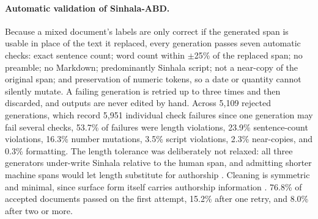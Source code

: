 \paragraph{Automatic validation of Sinhala-ABD.}
Because a mixed document's labels are only correct if the generated span is
usable in place of the text it replaced, every generation passes seven automatic
checks: exact sentence count; word count within $\pm$25\% of the replaced span;
no preamble; no Markdown; predominantly Sinhala script; not a near-copy of the
original span; and preservation of numeric tokens, so a date or quantity cannot
silently mutate. A failing generation is retried up to three times and then
discarded, and outputs are never edited by hand. Across 5{,}109 rejected
generations, which record 5{,}951 individual check failures since one generation
may fail several checks, 53.7\% of failures were length violations, 23.9\%
sentence-count violations, 16.3\% number mutations, 3.5\% script violations,
2.3\% near-copies, and 0.3\% formatting. The length tolerance was deliberately
not relaxed: all three generators under-write Sinhala relative to the human
span, and admitting shorter machine spans would let length substitute for
authorship \citep{doughman2024limitations}. Cleaning is symmetric and minimal,
since surface form itself carries authorship information
\citep{mcgovern2024fingerprints}. 76.8\% of accepted documents passed on the
first attempt, 15.2\% after one retry, and 8.0\% after two or more.
